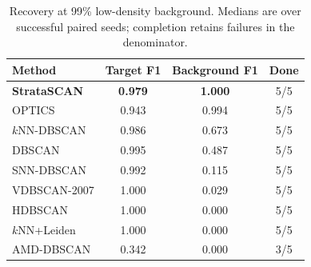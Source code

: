 \begin{table}[t]
\caption{Recovery at 99\% low-density background. Medians are over successful paired seeds; completion retains failures in the denominator.}
\label{tab:rare-dense-99}
\centering
\footnotesize
\setlength{\tabcolsep}{3.2pt}
\begin{tabular}{lccc}
\hline
Method & Target F1 & Background F1 & Done \\
\hline
\textbf{StrataSCAN} & \textbf{0.979} & \textbf{1.000} & 5/5 \\
OPTICS & 0.943 & 0.994 & 5/5 \\
$k$NN-DBSCAN & 0.986 & 0.673 & 5/5 \\
DBSCAN & 0.995 & 0.487 & 5/5 \\
SNN-DBSCAN & 0.992 & 0.115 & 5/5 \\
VDBSCAN-2007 & 1.000 & 0.029 & 5/5 \\
HDBSCAN & 1.000 & 0.000 & 5/5 \\
$k$NN+Leiden & 1.000 & 0.000 & 5/5 \\
AMD-DBSCAN & 0.342 & 0.000 & 3/5 \\
\hline
\end{tabular}
\end{table}
